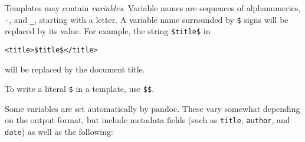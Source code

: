 \documentclass[]{article}
\begin{document}
Templates may contain \emph{variables}. Variable names are sequences of
alphanumerics, \texttt{-}, and \texttt{\_}, starting with a letter. A
variable name surrounded by \texttt{\$} signs will be replaced by its
value. For example, the string \texttt{\$title\$} in

\begin{verbatim}
<title>$title$</title>
\end{verbatim}

will be replaced by the document title.

To write a literal \texttt{\$} in a template, use \texttt{\$\$}.

Some variables are set automatically by pandoc. These vary somewhat
depending on the output format, but include metadata fields (such as
\texttt{title}, \texttt{author}, and \texttt{date}) as well as the
following:
\end{document}
